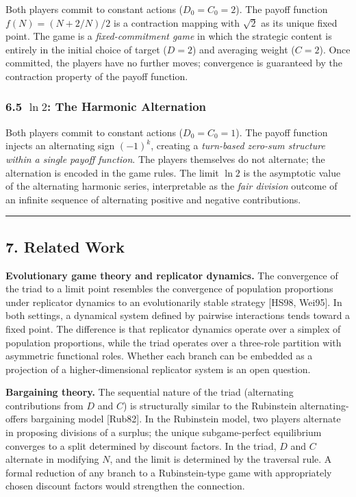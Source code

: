 \documentclass[
  11pt,
  letterpaper,
]{article}
\begin{document}
Both players commit to constant actions (\(D_0 = C_0 = 2\)). The payoff
function \(f(N) = (N + 2/N)/2\) is a contraction mapping with
\(\sqrt{2}\) as its unique fixed point. The game is a
\emph{fixed-commitment game} in which the strategic content is entirely
in the initial choice of target (\(D = 2\)) and averaging weight
(\(C = 2\)). Once committed, the players have no further moves;
convergence is guaranteed by the contraction property of the payoff
function.

\subsubsection{\texorpdfstring{6.5 \(\ln 2\): The Harmonic
Alternation}{6.5 \textbackslash ln 2: The Harmonic Alternation}}\label{ln-2-the-harmonic-alternation}

Both players commit to constant actions (\(D_0 = C_0 = 1\)). The payoff
function injects an alternating sign \((-1)^k\), creating a
\emph{turn-based zero-sum structure within a single payoff function}.
The players themselves do not alternate; the alternation is encoded in
the game rules. The limit \(\ln 2\) is the asymptotic value of the
alternating harmonic series, interpretable as the \emph{fair division}
outcome of an infinite sequence of alternating positive and negative
contributions.

\begin{center}\rule{0.5\linewidth}{0.5pt}\end{center}

\subsection{7. Related Work}\label{related-work}

\textbf{Evolutionary game theory and replicator dynamics.} The
convergence of the triad to a limit point resembles the convergence of
population proportions under replicator dynamics to an evolutionarily
stable strategy {[}HS98, Wei95{]}. In both settings, a dynamical system
defined by pairwise interactions tends toward a fixed point. The
difference is that replicator dynamics operate over a simplex of
population proportions, while the triad operates over a three-role
partition with asymmetric functional roles. Whether each branch can be
embedded as a projection of a higher-dimensional replicator system is an
open question.

\textbf{Bargaining theory.} The sequential nature of the triad
(alternating contributions from \(D\) and \(C\)) is structurally similar
to the Rubinstein alternating-offers bargaining model {[}Rub82{]}. In
the Rubinstein model, two players alternate in proposing divisions of a
surplus; the unique subgame-perfect equilibrium converges to a split
determined by discount factors. In the triad, \(D\) and \(C\) alternate
in modifying \(N\), and the limit is determined by the traversal rule. A
formal reduction of any branch to a Rubinstein-type game with
appropriately chosen discount factors would strengthen the connection.
\end{document}
